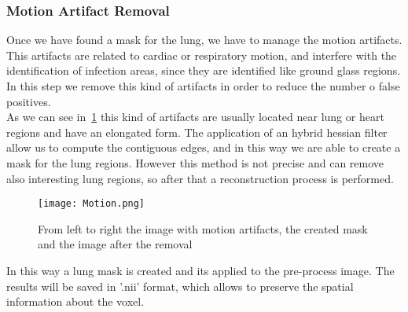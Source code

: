 \documentclass{standalone}
\begin{document}
	\subsubsection*{Motion Artifact Removal}
	
	Once we have found a mask for the lung, we have to manage the motion artifacts. This artifacts are related to cardiac or respiratory motion, and interfere with the identification of infection areas, since they are identified like ground glass regions.  In this step we remove this kind of artifacts in order to reduce the number o false positives.\\ As we can see in  \figurename\,\ref{fig:Motion} this kind of artifacts are usually located near lung or heart regions and have an elongated form. The application of an hybrid hessian filter allow us to compute the contiguous edges, and in this way we are able to create a mask for the lung regions. However this method is not precise and can remove also interesting lung regions, so after that a reconstruction process is performed.\\
	
	\begin{figure}[h!]
		\centering
			\texttt{[image: Motion.png]}
			\caption{From left to right the image with motion artifacts, the created mask and the image after the removal}
			\label{fig:Motion}
	\end{figure}
	
	
	In this way a lung mask is created and its applied to the pre-process image. The results will be saved in '.nii' format, which allows to preserve the spatial information about the voxel.
	
	
	
		
\end{document}
